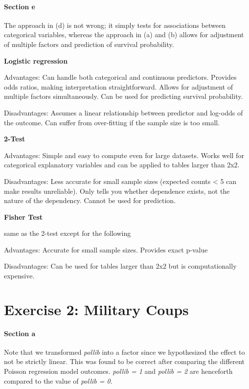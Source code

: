\documentclass[
  11pt,
]{article}
\begin{document}
\paragraph{Section e}\label{section-e}

The approach in (d) is not wrong; it simply tests for associations
between categorical variables, whereas the approach in (a) and (b)
allows for adjustment of multiple factors and prediction of survival
probability.

\textbf{Logistic regression}

Advantages: Can handle both categorical and continuous predictors.
Provides odds ratios, making interpretation straightforward. Allows for
adjustment of multiple factors simultaneously. Can be used for
predicting survival probability.

Disadvantages: Assumes a linear relationship between predictor and
log-odds of the outcome. Can suffer from over-fitting if the sample size
is too small.

\textbf{2-Test}

Advantages: Simple and easy to compute even for large datasets. Works
well for categorical explanatory variables and can be applied to tables
larger than 2x2.

Disadvantages: Less accurate for small sample sizes (expected counts
\textless{} 5 can make results unreliable). Only tells you whether
dependence exists, not the nature of the dependency. Cannot be used for
prediction.

\textbf{Fisher Test}

same as the 2-test except for the following

Advantages: Accurate for small sample sizes. Provides exact p-value

Disadvantages: Can be used for tables larger than 2x2 but is
computationally expensive.

\section{Exercise 2: Military Coups}\label{exercise-2-military-coups}

\paragraph{Section a}\label{section-a-1}

Note that we transformed \emph{pollib} into a factor since we
hypothesized the effect to not be strictly linear. This was found to be
correct after comparing the different Poisson regression model outcomes.
\emph{pollib = 1} and \emph{pollib = 2} are henceforth compared to the
value of \emph{pollib = 0}.
\end{document}
